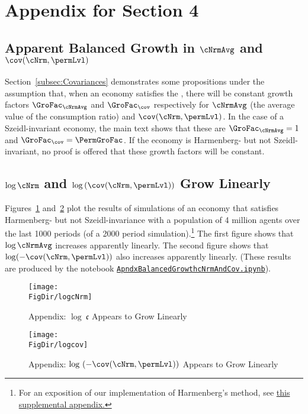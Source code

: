 \documentclass[\econtexRoot/BufferStockTheory]{subfiles}
\begin{document}
\hypertarget{ApndxBalancedGrowthcNrmAndCov}{}

\section{Appendix for Section 4}

\subsection{Apparent Balanced Growth in \texorpdfstring{$\cNrmAvg$}{c} and \texorpdfstring{$\cov(\cNrm,\permLvl)$}{cov(c,p)}}\label{sec:ApndxBalancedGrowthcNrmAndCov}

Section~\ref{subsec:Covariances} demonstrates some propositions under the assumption that, when an economy satisfies the {\GICRaw}, there will be constant growth factors $\GroFac_{\cNrmAvg}$ and $\GroFac_{\cov}$ respectively for $\cNrmAvg$ (the average value of the consumption ratio) and $\cov(\cNrm,\permLvl)$.  In the case of a Szeidl-invariant economy, the main text shows that these are $\GroFac_{\cNrmAvg}=1$ and $\GroFac_{\cov}=\PermGroFac$.  If the economy is Harmenberg- but not Szeidl-invariant, no proof is offered that these growth factors will be constant.

\subsection{\texorpdfstring{$\log \cNrm$}{log c} and \texorpdfstring{$\log \left(\cov(\cNrm,\permLvl)\right)$}{log cov(c,p)} Grow Linearly}
Figures~\ref{fig:logcNrm} and~\ref{fig:logcov} plot the results of simulations of an economy that satisfies Harmenberg- but not Szeidl-invariance with a population of 4 million agents over the last 1000 periods (of a 2000 period simulation).\footnote{For an exposition of our implementation of Harmenberg's method, see \href{https://github.com/econ-ark/BufferStockTheory/blob/master/Appendices/ApndxHarKmenberg.pdf}{this supplemental appendix.}}  The first figure shows that $\log \cNrmAvg$ increases apparently linearly.  The second figure shows that $\log (-\cov(\cNrm,\permLvl))$ also increases apparently linearly.  (These results are produced by the notebook \href{https://github.com/econ-ark/BufferStockTheory/blob/master/Code/Python/ApndxBalancedGrowthcNrmAndCov.ipynb}{\texttt{ApndxBalancedGrowthcNrmAndCov.ipynb}}).

\pagebreak
\begin{figure}[ht]
  \centerline{
    \texttt{[image: \\FigDir/logcNrm]}
  }
  \caption{Appendix: $\log ~\mathfrak{c}$ Appears to Grow Linearly}
  \label{fig:logcNrm}
\end{figure}
\begin{figure}[ht]
  \centerline{
    \texttt{[image: \\FigDir/logcov]}
  }
  \caption{Appendix: $\log ~(-\cov(\cNrm,\permLvl))$ Appears to Grow Linearly}
  \label{fig:logcov}
\end{figure}
\end{document}
